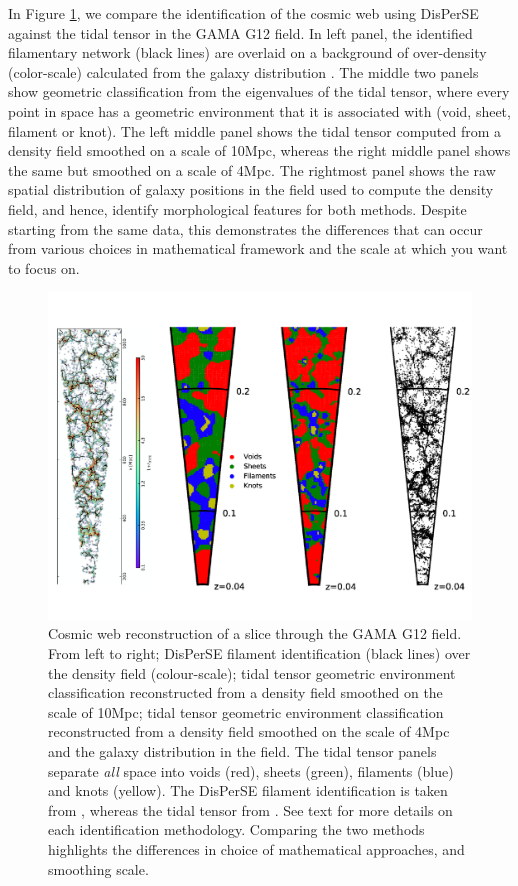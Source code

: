 In Figure \ref{fig:disperse_tt_comparison}, we compare the identification of the cosmic web using DisPerSE against the tidal tensor in the GAMA G12 field. In left panel, the identified filamentary network (black lines) are overlaid on a background of over-density (color-scale) calculated from the galaxy distribution \citep[taken from][]{kraljic2018}. The middle two panels show geometric classification from the eigenvalues of the tidal tensor, where every point in space has a geometric environment that it is associated with (void, sheet, filament or knot). The left middle panel shows the tidal tensor computed from a density field smoothed on a scale of 10Mpc, whereas the right middle panel shows the same but smoothed on a scale of 4Mpc. The rightmost panel shows the raw spatial distribution of galaxy positions in the field used to compute the density field, and hence, identify morphological features for both methods. Despite starting from the same data, this demonstrates the differences that can occur from various choices in mathematical framework and the scale at which you want to focus on.

\begin{figure}
    \centering
	\includegraphics[width=\linewidth]{thesis/latex/introduction/disperse_tt_comparison_gama.pdf}
    \caption{Cosmic web reconstruction of a slice through the GAMA G12 field. From left to right; DisPerSE filament identification (black lines) over the density field (colour-scale); tidal tensor geometric environment classification reconstructed from a density field smoothed on the scale of 10Mpc; tidal tensor geometric environment classification reconstructed from a density field smoothed on the scale of 4Mpc and the galaxy distribution in the field. The tidal tensor panels separate \textit{all} space into voids (red), sheets (green), filaments (blue) and knots (yellow). The DisPerSE filament identification is taken from \citet{kraljic2018}, whereas the tidal tensor from \citet{eardley2015}. See text for more details on each identification methodology. Comparing the two methods highlights the differences in choice of mathematical approaches, and smoothing scale.}
    \label{fig:disperse_tt_comparison}
\end{figure}

